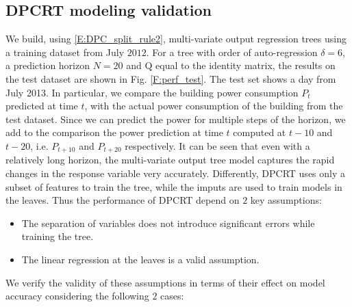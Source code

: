 \subsection{DPCRT modeling validation}

\textcolor[rgb]{1.00,0.00,0.00}{We build, using \eqref{E:DPC_split_rule2}, multi-variate output regression trees using a training dataset from July $2012$. For a tree with order of auto-regression $\delta = 6$, a prediction horizon $N = 20$ and $\mathrm{Q}$ equal to the identity matrix, the results on the test dataset are shown in Fig. \ref{F:perf_test}. The test set shows a day from July 2013. In particular, we compare the building power consumption $P_t$ predicted at time $t$, with the actual power consumption of the building from the test dataset. Since we can predict the power for multiple steps of the horizon, we add to the comparison the power prediction at time $t$ computed at $t-10$ and $t-20$, i.e. $P_{t+10}$ and $P_{t+20}$ respectively. It can be seen that even with a relatively long horizon, the multi-variate output tree model captures the rapid changes in the response variable very accurately. Differently, DPCRT uses only a subset of features to train the tree, while the imputs are used to train models in the leaves. Thus the performance of DPCRT depend on $2$ key assumptions:
\begin{itemize}[leftmargin=1cm]
	\item The separation of variables does not introduce significant errors while training the tree.
	\item The linear regression at the leaves is a valid assumption.
\end{itemize}
We verify the validity of these assumptions in terms of their effect on model accuracy considering the following $2$ cases:}

